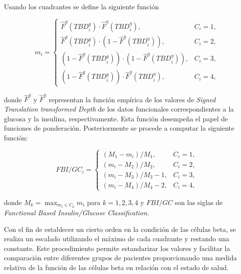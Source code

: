 Usando los cuadrantes se define la siguiente función

\begin{equation}
    m_i= \begin{cases}
    \widehat{F}^g\left(T B D_i^g\right) \cdot \widehat{F}^\eta\left(T B D_i^\eta\right), & C_i=1, \\ \widehat{F}^g\left(T B D_i^g\right) \cdot\left(1-\widehat{F}^\eta\left(T B D_i^\eta\right)\right), & C_i=2, \\ \left(1-\widehat{F}^g\left(T B D_i^g\right)\right) \cdot\left(1-\widehat{F}^\eta\left(T B D_i^\eta\right)\right), & C_i=3, \\ \left(1-\widehat{F}^g\left(T B D_i^g\right)\right) \cdot \widehat{F}^\eta\left(T B D_i^\eta\right), & C_i=4,\end{cases}
\end{equation}


donde $\widehat{F}^g$ y $\widehat{F}^{\eta}$ representan la función empírica de los valores de \textit{Signed Translation transformed Depth} de los datos funcionales correspondientes a la glucosa y la insulina, respectivamente. Esta función desempeña el papel de funciones de ponderación. Posteriormente se procede a computar la siguiente función:

\begin{equation}
    F B I / G C_i= \begin{cases}\left(M_1-m_i\right) / M_1, & C_i=1, \\ \left(m_i-M_2\right) / M_2, & C_i=2, \\ \left(m_i-M_3\right) / M_3-1, & C_i=3, \\ \left(m_i-M_4\right) / M_4-2, & C_i=4,\end{cases}
\end{equation}

donde $M_k =  \displaystyle \max_{m_i \in C_k} m_i$ para $k = 1, 2, 3, 4$ y $FBI/GC$ son las siglas de \textit{Functional Based Insulin/Glucose Classification}.


Con el fin de establecer un cierto orden en la condición de las células beta, se realiza un escalado utilizando el máximo de cada cuadrante y restando una constante. Este procedimiento permite estandarizar los valores y facilitar la comparación entre diferentes grupos de pacientes proporcionando una medida relativa de la función de las células beta en relación con el estado de salud.

